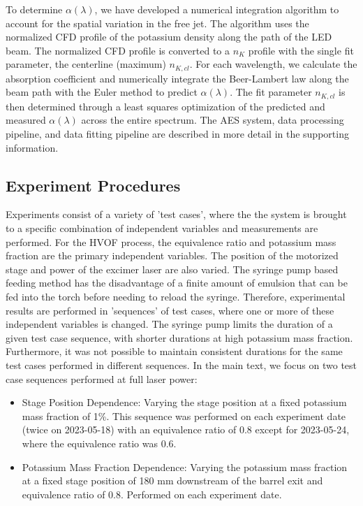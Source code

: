 To determine $\alpha(\lambda)$, we have developed a numerical integration algorithm to account for the spatial variation in the free jet. The algorithm uses the normalized CFD profile of the potassium density along the path of the LED beam. The normalized CFD profile is converted to a $n_K$ profile with the single fit parameter, the centerline (maximum) $n_{K, cl}$. For each wavelength, we calculate the absorption coefficient and numerically integrate the Beer-Lambert law along the beam path with the Euler method to predict $\alpha(\lambda)$. The fit parameter $n_{K,cl}$ is then determined through a least squares optimization of the predicted and measured $\alpha(\lambda)$ across the entire spectrum.  The AES system, data processing pipeline, and data fitting pipeline are described in more detail in the supporting information. 

\subsection{Experiment Procedures}

Experiments consist of a variety of 'test cases', where the the system is brought to a specific combination of independent variables and measurements are performed.   For the HVOF process, the equivalence ratio and potassium mass fraction are the primary independent variables. The position of the motorized stage and power of the excimer laser are also varied.  The syringe pump based feeding method has the disadvantage of a finite amount of emulsion that can be fed into the torch before needing to reload the syringe.  Therefore, experimental results are performed in 'sequences' of test cases, where one or more of these independent variables is changed. The syringe pump limits the duration of a given test case sequence, with shorter durations at high potassium mass fraction. Furthermore, it was not possible to maintain consistent durations for the same test cases performed in different sequences. In the main text, we focus on two test case sequences performed at full laser power:

\begin{itemize}
    \item Stage Position Dependence: Varying the stage position at a fixed potassium mass fraction of 1\%. This sequence was performed on each experiment date (twice on 2023-05-18) with an equivalence ratio of 0.8 except for 2023-05-24, where the equivalence ratio was 0.6.
    \item Potassium Mass Fraction Dependence: Varying the potassium mass fraction at a fixed stage position of 180 mm downstream of the barrel exit and equivalence ratio of 0.8. Performed on each experiment date.
\end{itemize}

